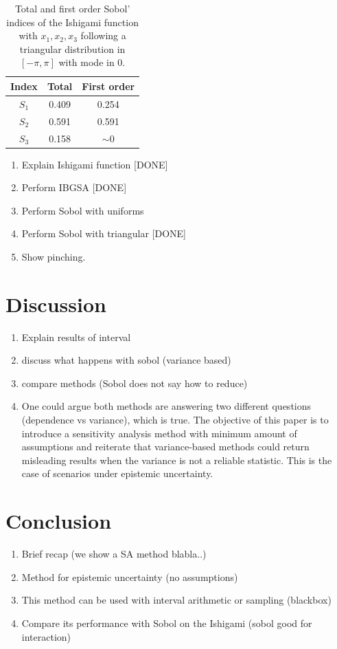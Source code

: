 \documentclass[twocolumn]{rps-esrel2022}
\begin{document}
\begin{table}[!h]
	\centering
	\caption{Total and first order Sobol' indices of the Ishigami function with $x_1,x_2,x_3$ following a triangular distribution in $[-\pi,\pi]$
	with mode in $0$.}
	\begin{tabular}{ccc}
	\hline
	Index & Total & First order \\ \hline
	$S_1$ & 0.409 & 0.254 \\
	$S_2$ & 0.591 & 0.591 \\
	$S_3$ & 0.158 & $\sim0$ \\ \hline
	\end{tabular}%
\end{table}

\begin{enumerate}
	\item Explain Ishigami function [DONE]
	\item Perform IBGSA [DONE]
	\item Perform Sobol with uniforms
	\item Perform Sobol with triangular [DONE]
	\item Show pinching.
\end{enumerate}

\section{Discussion}

\begin{enumerate}
	\item Explain results of interval
	\item discuss what happens with sobol (variance based)
	\item compare methods (Sobol does not say how to reduce)
	\item One could argue both methods are answering two different questions (dependence vs variance), which is true.
	The objective of this paper is to introduce a sensitivity analysis method with minimum amount of assumptions and reiterate
	that variance-based methods could return misleading results when the variance is not a reliable statistic.
	This is the case of scenarios under epistemic uncertainty.
\end{enumerate}

\section{Conclusion}

\begin{enumerate}
	\item Brief recap (we show a SA method blabla..)
	\item Method for epistemic uncertainty (no assumptions)
	\item This method can be used with interval arithmetic or sampling (blackbox)
	\item Compare its performance with Sobol on the Ishigami (sobol good for interaction)
\end{enumerate}
\end{document}
